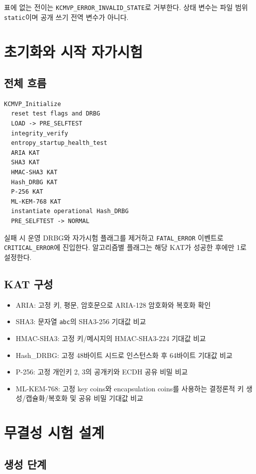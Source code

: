 \documentclass[11pt,a4paper]{article}
\begin{document}
표에 없는 전이는 \texttt{KCMVP\_ERROR\_INVALID\_STATE}로 거부한다. 상태 변수는
파일 범위 \texttt{static}이며 공개 쓰기 전역 변수가 아니다.

\section{초기화와 시작 자가시험}

\subsection{전체 흐름}

\begin{lstlisting}
KCMVP_Initialize
  reset test flags and DRBG
  LOAD -> PRE_SELFTEST
  integrity_verify
  entropy_startup_health_test
  ARIA KAT
  SHA3 KAT
  HMAC-SHA3 KAT
  Hash_DRBG KAT
  P-256 KAT
  ML-KEM-768 KAT
  instantiate operational Hash_DRBG
  PRE_SELFTEST -> NORMAL
\end{lstlisting}

실패 시 운영 DRBG와 자가시험 플래그를 제거하고 \texttt{FATAL\_ERROR} 이벤트로
\texttt{CRITICAL\_ERROR}에 진입한다. 알고리즘별 플래그는 해당 KAT가 성공한
후에만 1로 설정한다.

\subsection{KAT 구성}

\begin{itemize}
  \item ARIA: 고정 키, 평문, 암호문으로 ARIA-128 암호화와 복호화 확인
  \item SHA3: 문자열 \texttt{abc}의 SHA3-256 기대값 비교
  \item HMAC-SHA3: 고정 키/메시지의 HMAC-SHA3-224 기대값 비교
  \item Hash\_DRBG: 고정 48바이트 시드로 인스턴스화 후 64바이트 기대값 비교
  \item P-256: 고정 개인키 2, 3의 공개키와 ECDH 공유 비밀 비교
  \item ML-KEM-768: 고정 key coins와 encapsulation coins를 사용하는 결정론적
        키 생성/캡슐화/복호화 및 공유 비밀 기대값 비교
\end{itemize}

\section{무결성 시험 설계}

\subsection{생성 단계}
\end{document}
